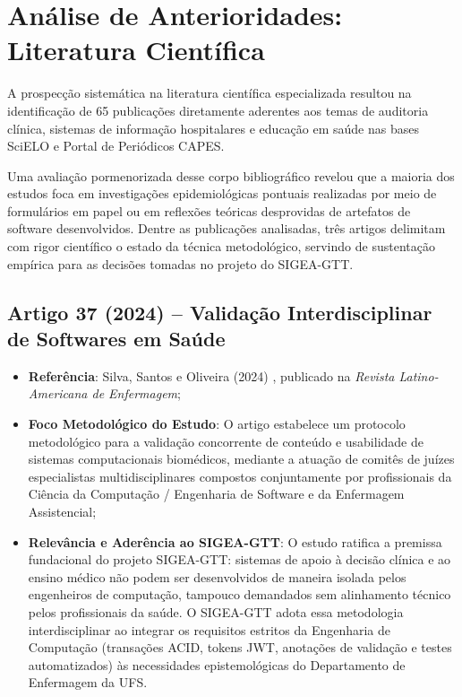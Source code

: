 \chapter{Análise de Anterioridades: Literatura Científica}
\label{cap_analise_literatura}

A prospecção sistemática na literatura científica especializada resultou na identificação de 65 publicações diretamente aderentes aos temas de auditoria clínica, sistemas de informação hospitalares e educação em saúde nas bases SciELO e Portal de Periódicos CAPES. 

Uma avaliação pormenorizada desse corpo bibliográfico revelou que a maioria dos estudos foca em investigações epidemiológicas pontuais realizadas por meio de formulários em papel ou em reflexões teóricas desprovidas de artefatos de software desenvolvidos. Dentre as publicações analisadas, três artigos delimitam com rigor científico o estado da técnica metodológico, servindo de sustentação empírica para as decisões tomadas no projeto do SIGEA-GTT.

\section{Artigo 37 (2024) -- Validação Interdisciplinar de Softwares em Saúde}
\label{sec_artigo_validacao}

\begin{itemize}
    \item \textbf{Referência}: Silva, Santos e Oliveira (2024) \cite{artigo_validacao2024}, publicado na \textit{Revista Latino-Americana de Enfermagem};
    \item \textbf{Foco Metodológico do Estudo}: O artigo estabelece um protocolo metodológico para a validação concorrente de conteúdo e usabilidade de sistemas computacionais biomédicos, mediante a atuação de comitês de juízes especialistas multidisciplinares compostos conjuntamente por profissionais da Ciência da Computação / Engenharia de Software e da Enfermagem Assistencial;
    \item \textbf{Relevância e Aderência ao SIGEA-GTT}: O estudo ratifica a premissa fundacional do projeto SIGEA-GTT: sistemas de apoio à decisão clínica e ao ensino médico não podem ser desenvolvidos de maneira isolada pelos engenheiros de computação, tampouco demandados sem alinhamento técnico pelos profissionais da saúde. O SIGEA-GTT adota essa metodologia interdisciplinar ao integrar os requisitos estritos da Engenharia de Computação (transações ACID, tokens JWT, anotações de validação e testes automatizados) às necessidades epistemológicas do Departamento de Enfermagem da UFS.
\end{itemize}

